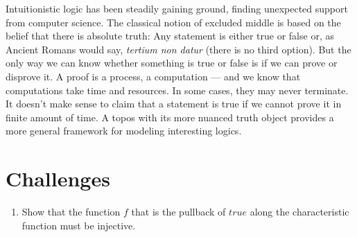 Intuitionistic logic has been steadily gaining ground, finding
unexpected support from computer science. The classical notion of
excluded middle is based on the belief that there is absolute truth: Any
statement is either true or false or, as Ancient Romans would say,
\emph{tertium non datur} (there is no third option). But the only way we
can know whether something is true or false is if we can prove or
disprove it. A proof is a process, a computation --- and we know that
computations take time and resources. In some cases, they may never
terminate. It doesn't make sense to claim that a statement is true if we
cannot prove it in finite amount of time. A topos with its more nuanced
truth object provides a more general framework for modeling interesting
logics.

\section{Challenges}

\begin{enumerate}
  \tightlist
  \item
        Show that the function $f$ that is the pullback of
        $\mathit{true}$ along the characteristic function must be injective.
\end{enumerate}
